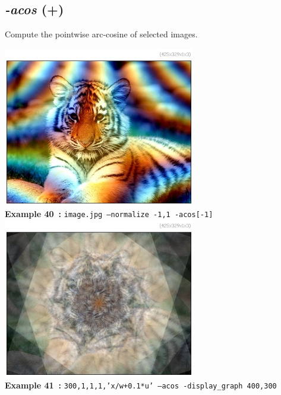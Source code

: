 \documentclass[a4paper,11pt,twoside]{book}
\begin{document}
\subsection{\emph{-acos} (+)}\vspace*{-0.5em}
Compute the pointwise arc-cosine of selected images.
\begin{center}\includegraphics[keepaspectratio=true,height=7cm,width=\textwidth]{img/gmic_def40.jpg}\\
{\footnotesize \textbf{Example 40~:} \texttt{image.jpg --normalize -1,1 -acos[-1]}}
\\\includegraphics[keepaspectratio=true,height=7cm,width=\textwidth]{img/gmic_def41.jpg}\\
{\footnotesize \textbf{Example 41~:} \texttt{300,1,1,1,'x/w+0.1*u' --acos -display\_graph 400,300}}
\end{center}
\end{document}
